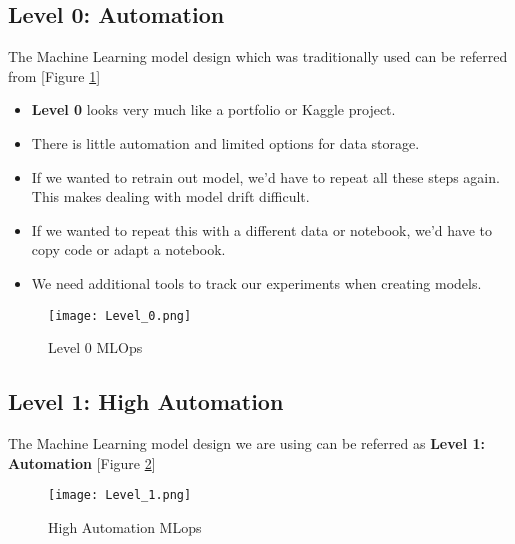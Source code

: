 \documentclass[12pt,oneside,a4paper]{report}
\begin{document}
\newpage
\subsection{Level 0: Automation}
\fontsize{12pt}{10pt}\selectfont
The Machine Learning model design which was traditionally used can be referred from [Figure \ref{fig_level0}]

\begin{itemize}
\item \textbf{Level 0} looks very much like a portfolio or Kaggle project.
\item There is little automation and limited options for data storage.
\item If we wanted to retrain out model, we’d have to repeat all these steps again. This makes dealing with model drift difficult.
\item If we wanted to repeat this with a different data or notebook, we’d have to copy code or adapt a notebook.
\item We need additional tools to track our experiments when creating models.
\end{itemize}

\begin{figure}[h]
\centering
\texttt{[image: Level\_0.png]}
\caption{Level 0 MLOps}
\label{fig_level0}
\end{figure}





\newpage
\subsection{Level 1: High Automation}
\fontsize{12pt}{10pt}\selectfont
The Machine Learning model design we are using can be referred as \textbf{Level 1: Automation} [Figure \ref{fig_level1}]

\begin{figure}[h]
\centering
\texttt{[image: Level\_1.png]}
\caption{High Automation MLops}
\label{fig_level1}
\end{figure}
\end{document}
